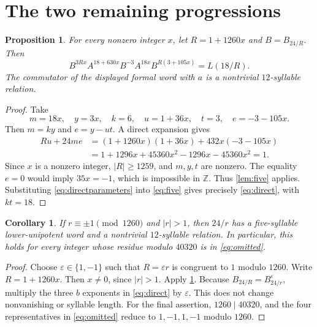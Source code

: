 \documentclass[11pt]{article}
\newtheorem{proposition}[theorem]{Proposition}
\newtheorem{corollary}[theorem]{Corollary}
\theoremstyle{definition}
\theoremstyle{remark}
\numberwithin{equation}{section}
\newcommand{\Z}{\mathbb Z}
\begin{document}
\section{The two remaining progressions}\label{sec:direct}
\begin{proposition}\label{prop:direct}
For every nonzero integer $x$, let $R=1+1260x$ and $B=B_{24/R}$.
Then
\begin{equation}\label{eq:direct}
 B^{3Rx}A^{18+630x}B^{-3}A^{18x}B^{R(3+105x)}=L(18/R).
\end{equation}
The commutator of the displayed formal word with $a$ is a
nontrivial $12$-syllable relation.
\end{proposition}
\begin{proof}
Take
\begin{equation}\label{eq:directparameters}
 m=18x,\quad y=3x,\quad k=6,\quad u=1+36x,
 \quad t=3,\quad e=-3-105x.
\end{equation}
Then $m=ky$ and $e=y-ut$. A direct expansion gives
\begin{align*}
 Ru+24me
 &=(1+1260x)(1+36x)+432x(-3-105x)\\
 &=1+1296x+45360x^2-1296x-45360x^2=1.
\end{align*}
Since $x$ is a nonzero integer, $|R|\ge1259$, and $m,y,t$ are
nonzero. The equality $e=0$ would imply $35x=-1$, which is
impossible in $\Z$. Thus \cref{lem:five} applies. Substituting
\eqref{eq:directparameters} into \eqref{eq:five} gives precisely
\eqref{eq:direct}, with $kt=18$.
\end{proof}

\begin{corollary}\label{cor:progressions}
If $r\equiv\pm1\pmod{1260}$ and $|r|>1$, then $24/r$ has a
five-syllable lower-unipotent word and a nontrivial $12$-syllable
relation. In particular, this holds for every integer whose residue
modulo $40320$ is in \eqref{eq:omitted}.
\end{corollary}
\begin{proof}
Choose $\varepsilon\in\{1,-1\}$ such that $R=\varepsilon r$
is congruent to $1$ modulo $1260$. Write $R=1+1260x$.
Then $x\ne0$, since $|r|>1$. Apply \cref{prop:direct}.
Because $B_{24/R}=B_{24/r}^{\varepsilon}$, multiply the three
$b$ exponents in \eqref{eq:direct} by $\varepsilon$. This does
not change nonvanishing or syllable length. For the final assertion,
$1260\mid40320$, and the four representatives in \eqref{eq:omitted}
reduce to $1,-1,1,-1$ modulo $1260$.
\end{proof}
\end{document}
